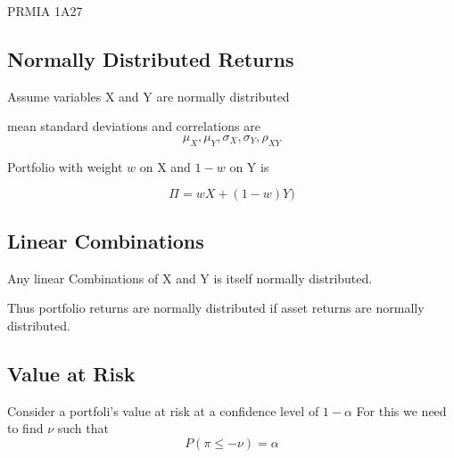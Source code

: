 PRMIA 1A27
\subsection*{Normally Distributed Returns}

Assume variables X and Y are normally distributed

mean standard deviations and correlations are
\[ \mu_X, \mu_Y, \sigma_X, \sigma_Y, \rho_{XY} \]

Portfolio with weight $w$ on X and $1-w$ on Y is

\[\Pi = wX+(1-w)Y)\]
\subsection*{Linear Combinations}
Any linear Combinations of X and Y is itself normally distributed.

Thus portfolio returns are normally distributed if asset returns are normally distributed.
\subsection*{Value at Risk}
Consider a portfoli's value at risk at a confidence level of $1-\alpha$
For this we need to find $\nu$ such that
\[ P(\pi \leq -\nu) = \alpha\]
